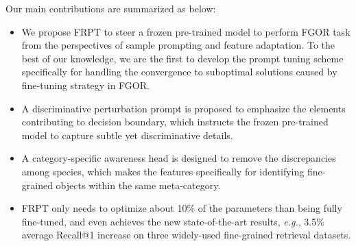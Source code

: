 \documentclass[letterpaper]{article} %
\begin{document}



Our main contributions are summarized as below:
\begin{itemize}
    \item  We propose FRPT to steer a frozen pre-trained model to perform FGOR task from the perspectives of sample prompting and feature adaptation. To the best of our knowledge, we are the first to develop the prompt tuning scheme specifically for handling the convergence to suboptimal solutions caused by fine-tuning strategy in FGOR.

 \item A discriminative perturbation prompt is proposed to emphasize the elements contributing to decision boundary, which instructs the frozen pre-trained model to capture subtle yet discriminative details.

\item A category-specific awareness head is designed to remove the discrepancies among species, which makes the features specifically for identifying fine-grained objects within the same meta-category.


\item FRPT only needs to optimize about 10\% of the parameters than being fully fine-tuned, and even achieves the new state-of-the-art results, {\it e.g.}, 3.5\% average Recall@1 increase on three widely-used fine-grained retrieval datasets.
\end{itemize}

\end{document}
